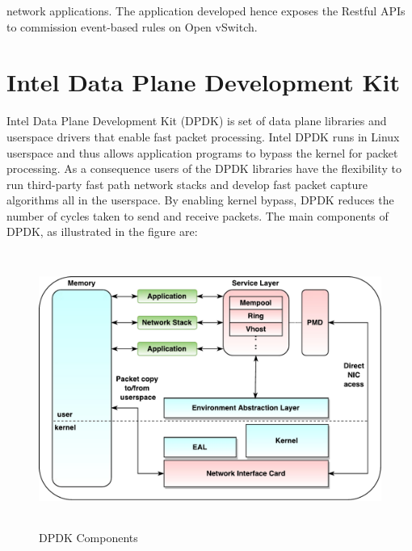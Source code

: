 network applications. The application developed hence exposes the Restful APIs to commission event-based rules on Open vSwitch.


\section{Intel Data Plane Development Kit}
Intel Data Plane Development Kit (DPDK) \cite{DPDK} is set of data plane libraries and userspace drivers that enable fast packet processing. Intel DPDK runs in Linux userspace and thus allows application programs to bypass the kernel for packet processing. As a consequence users of the DPDK libraries have the flexibility to run third-party fast path network stacks and develop fast packet capture algorithms all in the userspace. By enabling kernel bypass, DPDK reduces the number of cycles taken to send and receive packets. The main components of DPDK, as illustrated in the figure  are:

 \begin{figure}[H]
 \centering
 \caption{DPDK Components}
 \includegraphics[height=9cm]{DPDK.pdf}
\end{figure}

